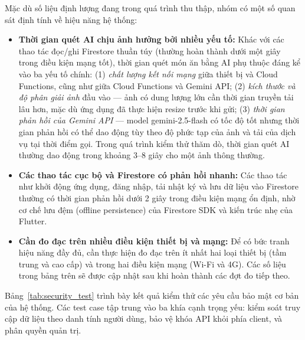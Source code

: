 Mặc dù số liệu định lượng đang trong quá trình thu thập, nhóm có một số quan sát định tính về hiệu năng hệ thống:

\begin{itemize}
    \item \textbf{Thời gian quét AI chịu ảnh hưởng bởi nhiều yếu tố:} Khác với các thao tác đọc/ghi Firestore thuần túy (thường hoàn thành dưới một giây trong điều kiện mạng tốt), thời gian quét món ăn bằng AI phụ thuộc đáng kể vào ba yếu tố chính: (1) \textit{chất lượng kết nối mạng} giữa thiết bị và Cloud Functions, cũng như giữa Cloud Functions và Gemini API; (2) \textit{kích thước và độ phân giải ảnh} đầu vào — ảnh có dung lượng lớn cần thời gian truyền tải lâu hơn, mặc dù ứng dụng đã thực hiện resize trước khi gửi; (3) \textit{thời gian phản hồi của Gemini API} — model gemini-2.5-flash có tốc độ tốt nhưng thời gian phản hồi có thể dao động tùy theo độ phức tạp của ảnh và tải của dịch vụ tại thời điểm gọi. Trong quá trình kiểm thử thăm dò, thời gian quét AI thường dao động trong khoảng 3--8 giây cho một ảnh thông thường.

    \item \textbf{Các thao tác cục bộ và Firestore có phản hồi nhanh:} Các thao tác như khởi động ứng dụng, đăng nhập, tải nhật ký và lưu dữ liệu vào Firestore thường có thời gian phản hồi dưới 2 giây trong điều kiện mạng ổn định, nhờ cơ chế lưu đệm (offline persistence) của Firestore SDK và kiến trúc nhẹ của Flutter.

    \item \textbf{Cần đo đạc trên nhiều điều kiện thiết bị và mạng:} Để có bức tranh hiệu năng đầy đủ, cần thực hiện đo đạc trên ít nhất hai loại thiết bị (tầm trung và cao cấp) và trong hai điều kiện mạng (Wi-Fi và 4G). Các số liệu trong bảng trên sẽ được cập nhật sau khi hoàn thành các đợt đo tiếp theo.
\end{itemize}

Bảng~\ref{tab:security_test} trình bày kết quả kiểm thử các yêu cầu bảo mật cơ bản của hệ thống. Các test case tập trung vào ba khía cạnh trọng yếu: kiểm soát truy cập dữ liệu theo danh tính người dùng, bảo vệ khóa API khỏi phía client, và phân quyền quản trị.

